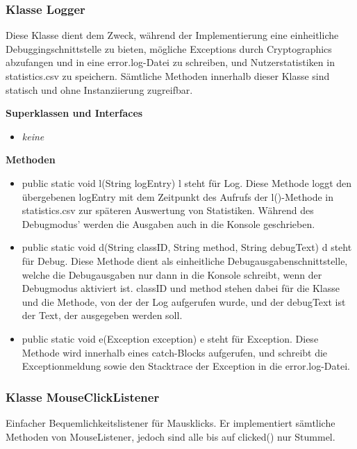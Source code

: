 \documentclass{article}
\begin{document}
    \subsubsection{Klasse Logger}
    Diese Klasse dient dem Zweck, während der Implementierung eine einheitliche Debuggingschnittstelle
    zu bieten, mögliche Exceptions durch Cryptographics abzufangen und in eine error.log-Datei zu schreiben,
    und Nutzerstatistiken in statistics.csv zu speichern. Sämtliche Methoden innerhalb dieser Klasse
    sind statisch und ohne Instanziierung zugreifbar.\newline

    \textbf{Superklassen und Interfaces}
      \begin{itemize}
        \item \textit{keine}
      \end{itemize}
           
    \textbf{Methoden}
      \begin{itemize}
        \item public static void l(String logEntry)\newline
              l steht für Log. Diese Methode loggt den übergebenen logEntry mit dem Zeitpunkt
              des Aufrufs der l()-Methode in statistics.csv zur späteren Auswertung von Statistiken.
              Während des Debugmodus' werden die Ausgaben auch in die Konsole geschrieben.
		\item public static void d(String classID, String method, String debugText) \newline
			  d steht für Debug. Diese Methode dient als einheitliche Debugausgabenschnittstelle, 
			  welche die Debugausgaben nur dann in die Konsole schreibt, wenn der Debugmodus aktiviert ist.
			  classID und method stehen dabei für die Klasse und die Methode, von der der Log aufgerufen wurde,
			  und der debugText ist der Text, der ausgegeben werden soll.
		\item public static void e(Exception exception) \newline
			  e steht für Exception. Diese Methode wird innerhalb eines catch-Blocks aufgerufen, und schreibt
			  die Exceptionmeldung sowie den Stacktrace der Exception in die error.log-Datei.
      \end{itemize}

    \subsubsection{Klasse MouseClickListener}
    Einfacher Bequemlichkeitslistener für Mausklicks. Er implementiert sämtliche Methoden von 
    MouseListener, jedoch sind alle bis auf clicked() nur Stummel.\newline
\end{document}

